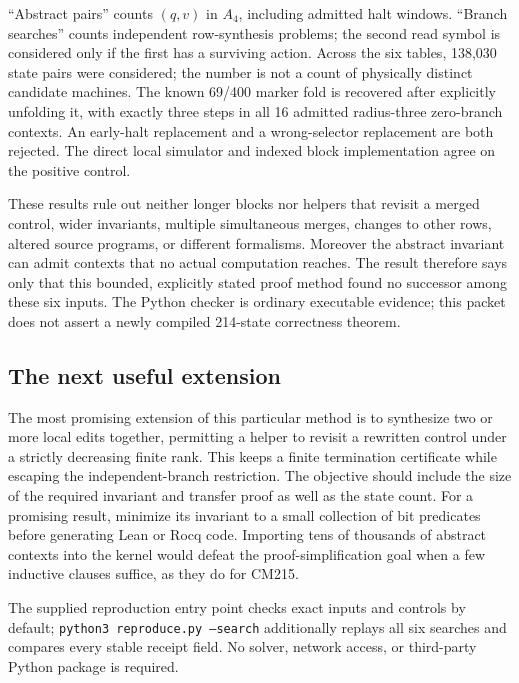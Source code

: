 ``Abstract pairs'' counts $(q,v)$ in $A_4$, including admitted halt
windows.  ``Branch searches'' counts independent row-synthesis problems; the
second read symbol is considered only if the first has a surviving action.
Across the six tables, 138,030 state pairs were considered;
the number is not a count of physically distinct candidate machines.
The known 69/400 marker fold is recovered after explicitly unfolding it,
with exactly three steps in all 16 admitted radius-three zero-branch
contexts.  An early-halt replacement and a wrong-selector replacement are
both rejected.  The direct local simulator and indexed block implementation
agree on the positive control.

These results rule out neither longer blocks nor helpers that revisit a
merged control, wider invariants, multiple simultaneous merges, changes to
other rows, altered source programs, or different formalisms.  Moreover the
abstract invariant can admit contexts that no actual computation reaches.
The result therefore says only that this bounded, explicitly stated proof
method found no successor among these six inputs.  The Python checker is
ordinary executable evidence; this packet does not assert a newly compiled
214-state correctness theorem.

\subsection{The next useful extension}

The most promising extension of this particular method is to synthesize
two or more local edits together, permitting a helper to revisit a rewritten
control under a strictly decreasing finite rank.  This keeps a finite
termination certificate while escaping the independent-branch restriction.
The objective should include the size of the required invariant and transfer
proof as well as the state count.  For a promising result, minimize its
invariant to a small collection of bit predicates before generating Lean
or Rocq code.  Importing tens of thousands of abstract contexts into the
kernel would defeat the proof-simplification goal when a few inductive
clauses suffice, as they do for CM215.

The supplied reproduction entry point checks exact inputs and controls by
default; \texttt{python3 reproduce.py --search} additionally replays all six
searches and compares every stable receipt field.  No solver, network
access, or third-party Python package is required.
